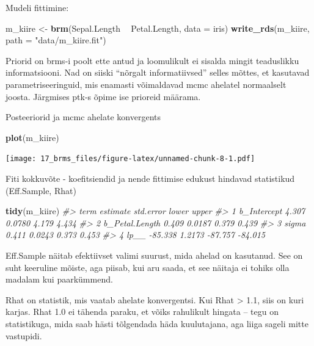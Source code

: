 \documentclass[]{book}
\newenvironment{Shaded}{\begin{snugshade}}{\end{snugshade}}
\newcommand{\KeywordTok}[1]{\textcolor[rgb]{0.13,0.29,0.53}{\textbf{#1}}}
\newcommand{\DataTypeTok}[1]{\textcolor[rgb]{0.13,0.29,0.53}{#1}}
\newcommand{\StringTok}[1]{\textcolor[rgb]{0.31,0.60,0.02}{#1}}
\newcommand{\CommentTok}[1]{\textcolor[rgb]{0.56,0.35,0.01}{\textit{#1}}}
\newcommand{\OperatorTok}[1]{\textcolor[rgb]{0.81,0.36,0.00}{\textbf{#1}}}
\newcommand{\NormalTok}[1]{#1}
\begin{document}
Mudeli fittimine:

\begin{Shaded}
\begin{Highlighting}[]
\NormalTok{m_kiire <-}\StringTok{ }\KeywordTok{brm}\NormalTok{(Sepal.Length }\OperatorTok{~}\StringTok{ }\NormalTok{Petal.Length, }\DataTypeTok{data =}\NormalTok{ iris)}
\KeywordTok{write_rds}\NormalTok{(m_kiire, }\DataTypeTok{path =} \StringTok{"data/m_kiire.fit"}\NormalTok{)}
\end{Highlighting}
\end{Shaded}

Priorid on brms-i poolt ette antud ja loomulikult ei sisalda mingit
teaduslikku informatsiooni. Nad on siiski ``nõrgalt informatiivsed''
selles mõttes, et kasutavad parametriseeringuid, mis enamasti
võimaldavad mcmc ahelatel normaalselt joosta. Järgmises ptk-s õpime ise
prioreid määrama.

Posteeriorid ja mcmc ahelate konvergents

\begin{Shaded}
\begin{Highlighting}[]
\KeywordTok{plot}\NormalTok{(m_kiire)}
\end{Highlighting}
\end{Shaded}

\texttt{[image: 17\_brms\_files/figure-latex/unnamed-chunk-8-1.pdf]}

Fiti kokkuvõte - koefitsiendid ja nende fittimise edukust hindavad
statistikud (Eff.Sample, Rhat)

\begin{Shaded}
\begin{Highlighting}[]
\KeywordTok{tidy}\NormalTok{(m_kiire)}
\CommentTok{#>             term estimate std.error   lower   upper}
\CommentTok{#> 1    b_Intercept    4.307    0.0780   4.179   4.434}
\CommentTok{#> 2 b_Petal.Length    0.409    0.0187   0.379   0.439}
\CommentTok{#> 3          sigma    0.411    0.0243   0.373   0.453}
\CommentTok{#> 4           lp__  -85.338    1.2173 -87.757 -84.015}
\end{Highlighting}
\end{Shaded}

Eff.Sample näitab efektiivset valimi suurust, mida ahelad on kasutanud.
See on suht keeruline mõiste, aga piisab, kui aru saada, et see näitaja
ei tohiks olla madalam kui paarkümmend.

Rhat on statistik, mis vaatab ahelate konvergentsi. Kui Rhat
\textgreater{} 1.1, siis on kuri karjas. Rhat 1.0 ei tähenda paraku, et
võiks rahulikult hingata -- tegu on statistikuga, mida saab hästi
tõlgendada häda kuulutajana, aga liiga sageli mitte vastupidi.
\end{document}
